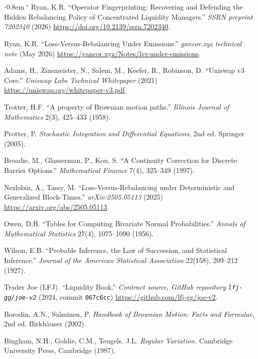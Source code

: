 \documentclass[11pt,a4paper]{article}
\makeatletter
\renewenvironment{thebibliography}[1]
  {\section*{\refname}%
   \fontsize{10pt}{12pt}\selectfont
   \list{\@biblabel{\@arabic\c@enumiv}}%
        {\settowidth\labelwidth{\@biblabel{#1}}%
         \leftmargin\labelwidth
         \advance\leftmargin-0.8em
         \advance\leftmargin\labelsep
         \setlength\itemindent{1em}%
         \setlength\itemsep{6pt plus 1pt minus 1pt}%
         \setlength\parsep{0pt}%
         \usecounter{enumiv}%
         \let\p@enumiv\@empty
         \renewcommand\theenumiv{\@arabic\c@enumiv}}%
   \sloppy\clubpenalty4000\widowpenalty4000\sfcode`\.\@m}
  {\def\@noitemerr{\@latex@warning{Empty `thebibliography' environment}}%
   \endlist}
\theoremstyle{definition}
\theoremstyle{plain}
\theoremstyle{remark}
\makeatother
\begin{document}
\begin{thebibliography}{45}
Ryan, K.R. ``Operator Fingerprinting: Recovering and Defending the Hidden Rebalancing Policy of Concentrated Liquidity Managers.'' \emph{SSRN preprint 7202340} (2026) \url{https://doi.org/10.2139/ssrn.7202340}.

Ryan, K.R. ``Loss-Versus-Rebalancing Under Emissions.'' \emph{gancor.xyz technical note} (May 2026) \url{https://gancor.xyz/Notes/lvr-under-emissions}.

Adams, H., Zinsmeister, N., Salem, M., Keefer, R., Robinson, D. ``Uniswap v3 Core.'' \emph{Uniswap Labs Technical Whitepaper} (2021) \url{https://uniswap.org/whitepaper-v3.pdf}.

Trotter, H.F. ``A property of Brownian motion paths.'' \emph{Illinois Journal of Mathematics} 2(3), 425--433 (1958).

Protter, P. \emph{Stochastic Integration and Differential Equations}, 2nd ed. Springer (2005).

Broadie, M., Glasserman, P., Kou, S. ``A Continuity Correction for Discrete Barrier Options.'' \emph{Mathematical Finance} 7(4), 325--349 (1997).

Nezlobin, A., Tassy, M. ``Loss-Versus-Rebalancing under Deterministic and Generalized Block-Times.'' \emph{arXiv:2505.05113} (2025) \url{https://arxiv.org/abs/2505.05113}.

Owen, D.B. ``Tables for Computing Bivariate Normal Probabilities.''
\emph{Annals of Mathematical Statistics} 27(4), 1075--1090 (1956).

Wilson, E.B. ``Probable Inference, the Law of Succession, and
Statistical Inference.'' \emph{Journal of the American Statistical
Association} 22(158), 209--212 (1927).

Trader Joe (LFJ). ``Liquidity Book.'' \emph{Contract source, GitHub
repository \texttt{lfj-gg/joe-v2}} (2024, commit \texttt{067c6cc})
\url{https://github.com/lfj-gg/joe-v2}.

Borodin, A.N., Salminen, P. \emph{Handbook of Brownian Motion: Facts and Formulae}, 2nd ed. Birkh\"auser (2002).

Bingham, N.H., Goldie, C.M., Teugels, J.L. \emph{Regular Variation.}
Cambridge University Press, Cambridge (1987).

\end{thebibliography}
\end{document}
